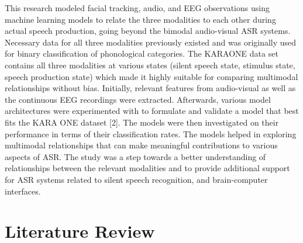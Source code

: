 \documentclass[11pt,letterpaper]{article}
\begin{document}
This research modeled facial tracking, audio, and EEG observations using machine learning models to relate the three modalities to each other during actual speech production, going beyond the bimodal audio-visual ASR systems. Necessary data for all three modalities previously existed and was originally used for binary classification of phonological categories. The KARAONE data set contains all three modalities at various states (silent speech state, stimulus state, speech production state) which made it highly suitable for comparing multimodal relationships without bias. Initially, relevant features from audio-visual as well as the continuous EEG recordings were extracted. Afterwards, various model architectures were experimented with to formulate and validate a model that best fits the KARA ONE dataset [2]. The models were then investigated on their performance in terms of their classification rates. The models helped in exploring multimodal relationships that can make meaningful contributions to various aspects of ASR.  The study was a step towards a better understanding of relationships between the relevant modalities and to provide additional support for ASR systems related to silent speech recognition, and brain-computer interfaces.

\section{Literature Review}
\end{document}
